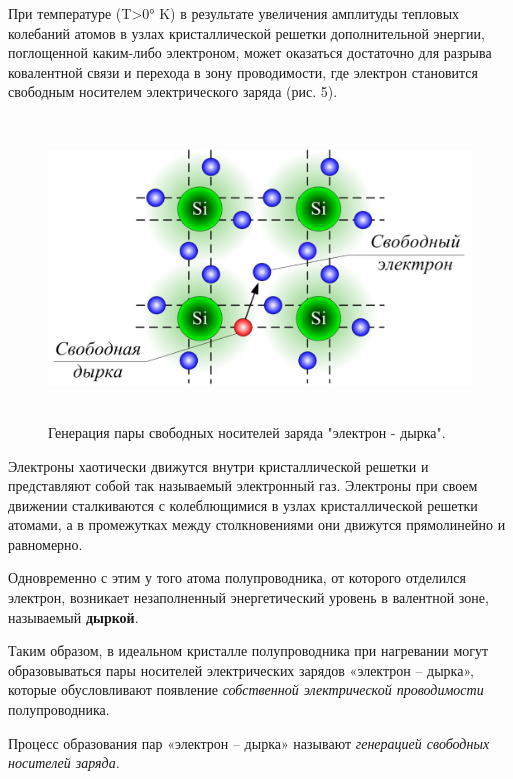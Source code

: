 	\par При температуре (T>0° K) в результате увеличения амплитуды тепловых колебаний атомов в узлах кристаллической решетки дополнительной энергии, поглощенной каким-либо электроном, может оказаться достаточно для разрыва ковалентной связи и перехода в зону проводимости, где электрон становится свободным носителем электрического заряда (рис. 5).
	
	\begin{figure}[h]
		\centering
		\includegraphics[height=8cm]{img/6} 
		\captionsetup{font=footnotesize}
		\caption{Генерация пары свободных носителей заряда "электрон - дырка".} 
	\end{figure}
	
	\par Электроны хаотически движутся внутри кристаллической решетки и представляют собой так называемый электронный газ. Электроны при своем движении сталкиваются с колеблющимися в узлах кристаллической решетки атомами, а в промежутках между столкновениями они движутся прямолинейно и равномерно.
    
    \par Одновременно с этим у того атома полупроводника, от которого отделился электрон, возникает незаполненный энергетический уровень в валентной зоне, называемый \textbf{дыркой}.
    
    \par Таким образом, в идеальном кристалле полупроводника при нагревании могут образовываться пары носителей электрических зарядов «электрон – дырка», которые обусловливают появление \textit{собственной электрической проводимости} полупроводника.
	
	\par Процесс образования пар «электрон – дырка» называют \textit{генерацией свободных носителей заряда}.
	
